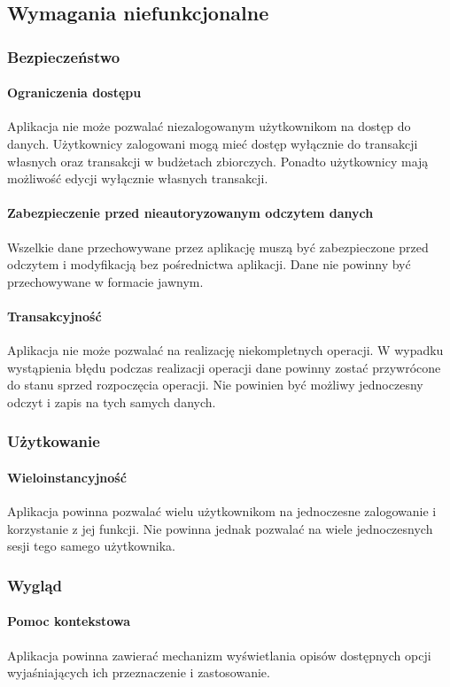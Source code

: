\newpage
\subsection{Wymagania niefunkcjonalne}

\subsubsection{Bezpieczeństwo}

\paragraph{Ograniczenia dostępu\newline}
Aplikacja nie może pozwalać niezalogowanym użytkownikom na dostęp do danych. Użytkownicy zalogowani mogą mieć dostęp wyłącznie do transakcji własnych oraz transakcji w budżetach zbiorczych. Ponadto użytkownicy mają możliwość edycji wyłącznie własnych transakcji.

\paragraph{Zabezpieczenie przed nieautoryzowanym odczytem danych\newline}
Wszelkie dane przechowywane przez aplikację muszą być zabezpieczone przed odczytem i modyfikacją bez pośrednictwa aplikacji. Dane nie powinny być przechowywane w formacie jawnym.

\paragraph{Transakcyjność\newline}
Aplikacja nie może pozwalać na realizację niekompletnych operacji. W wypadku wystąpienia błędu podczas realizacji operacji dane powinny zostać przywrócone do stanu sprzed rozpoczęcia operacji. Nie powinien być możliwy jednoczesny odczyt i zapis na tych samych danych.

\subsubsection{Użytkowanie}

\paragraph{Wieloinstancyjność\newline}
Aplikacja powinna pozwalać wielu użytkownikom na jednoczesne zalogowanie i korzystanie z jej funkcji. Nie powinna jednak pozwalać na wiele jednoczesnych sesji tego samego użytkownika.

\subsubsection{Wygląd}

\paragraph{Pomoc kontekstowa\newline}
Aplikacja powinna zawierać mechanizm wyświetlania opisów dostępnych opcji wyjaśniających ich przeznaczenie i zastosowanie.
